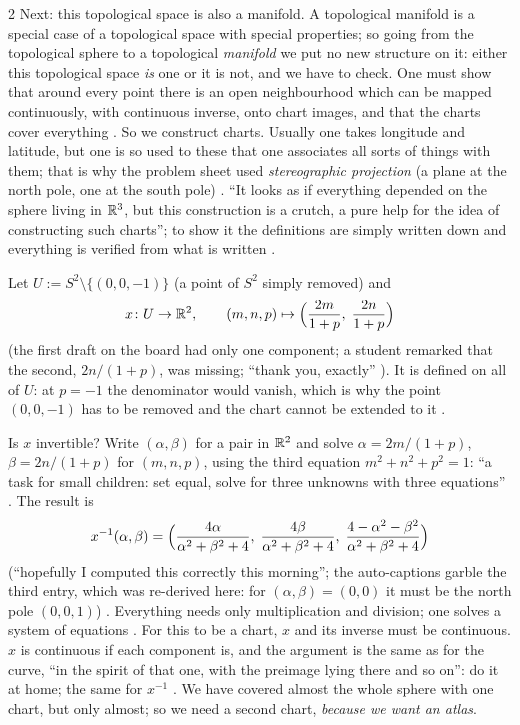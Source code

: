 \begin{paracol}{2}
Next: this topological space is also a manifold. A topological manifold is a special case of a topological space with special
properties; so going from the topological sphere to a topological \emph{manifold} we put no new structure on it: either this topological space
\emph{is} one or it is not, and we have to check. One must show that around every point there is an open neighbourhood which can be mapped
continuously, with continuous inverse, onto chart images, and that the charts cover everything . So we
construct charts. Usually one takes longitude and latitude, but one is so used to these that one associates all sorts of things with
them; that is why the problem sheet used \emph{stereographic projection} (a plane at the north pole, one at the south pole)
. ``It looks as if everything depended on the sphere living in $\mathbb{R}^3$, but this construction is a crutch, a pure help for the
idea of constructing such charts''; to show it the definitions are simply written down and everything is verified from what is written
.

\begin{example}\label{ex:sp-chart-x}
Let $U:=S^2\setminus\{(0,0,-1)\}$ (a point of $S^2$ simply removed) and
\[
  x\colon U\to\mathbb{R}^2,\qquad (m,n,p)\mapsto\Bigl(\frac{2m}{1+p},\;\frac{2n}{1+p}\Bigr)
\]
(the first draft on the board had only one component; a student remarked that the second, $2n/(1+p)$, was missing; ``thank you, exactly''
). It is defined on all of $U$: at $p=-1$ the denominator would vanish, which is why the point $(0,0,-1)$ has to be removed and
the chart cannot be extended to it .
\end{example}
Is $x$ invertible? Write $(\alpha,\beta)$ for a pair in $\mathbb{R}^2$ and solve $\alpha=2m/(1+p)$, $\beta=2n/(1+p)$ for $(m,n,p)$, using
the third equation $m^2+n^2+p^2=1$: ``a task for small children: set equal, solve for three unknowns with three equations''
. The result is
\begin{equation}\label{eq:sp-x-inverse}
  x^{-1}(\alpha,\beta)=\Bigl(\frac{4\alpha}{\alpha^2+\beta^2+4},\;\frac{4\beta}{\alpha^2+\beta^2+4},\;\frac{4-\alpha^2-\beta^2}{\alpha^2+\beta^2+4}\Bigr)
\end{equation}
(``hopefully I computed this correctly this morning''; the auto-captions garble the third entry, which was re-derived here:
for $(\alpha,\beta)=(0,0)$ it must be the north pole $(0,0,1)$) .
Everything needs only multiplication and division; one solves a system of equations .
For this to be a chart, $x$ and its inverse must be continuous. $x$ is continuous if each component is, and the argument is the same as for the
curve, ``in the spirit of that one, with the preimage lying there and so on'': do it at home; the same for $x^{-1}$ .
We have covered almost the whole sphere with one chart, but only almost; so we need a second chart, \emph{because we want an atlas}.


\end{paracol}
